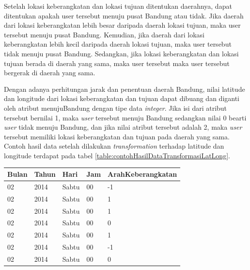 Setelah lokasi keberangkatan dan lokasi tujuan ditentukan daerahnya, dapat ditentukan apakah user tersebut menuju pusat Bandung atau tidak. Jika daerah dari lokasi keberangkatan lebih besar daripada daerah lokasi tujuan, maka user tersebut menuju pusat Bandung. Kemudian, jika daerah dari lokasi keberangkatan lebih kecil daripada daerah lokasi tujuan, maka user tersebut tidak menuju pusat Bandung. Sedangkan, jika lokasi keberangkatan dan lokasi tujuan berada di daerah yang sama, maka user tersebut maka user tersebut bergerak di daerah yang sama.

Dengan adanya perhitungan jarak dan penentuan daerah Bandung, nilai latitude dan longitude dari lokasi keberangkatan dan tujuan dapat dibuang dan diganti oleh atribut menujuBandung dengan tipe data \textsl{integer}. Jika isi dari atribut tersebut bernilai 1, maka \textsl{user} tersebut menuju Bandung sedangkan nilai 0 bearti \textsl{user} tidak menuju Bandung, dan jika nilai atribut tersebut adalah 2, maka \textsl{user} tersebut memiliki lokasi keberangkatan dan tujuan pada daerah yang sama. Contoh hasil data setelah dilakukan \textsl{transformation} terhadap latitude dan longitude terdapat pada tabel \ref{table:contohHasilDataTransformasiLatLong}.

\begin{table}[H]
\caption{Contoh hasil data transformasi latitude longitude}
\label{table:contohHasilDataTransformasiLatLong}
\begin{longtable}{|l|l|l|l|l|}
\hline
\textbf{Bulan}	& \textbf{Tahun} 	& \textbf{Hari} & \textbf{Jam}	& \textbf{ArahKeberangkatan} \\ \hline
02								& 2014						& Sabtu         & 00         	& -1                    \\ \hline
02								& 2014						& Sabtu         & 00         	& 1        					  \\ \hline
02								& 2014						& Sabtu         & 00         	& 1       							\\ \hline
02								& 2014						& Sabtu         & 00         	& 0         						\\ \hline
02								& 2014						& Sabtu         & 00         	& 1          					\\ \hline
02								& 2014						& Sabtu         & 00         	& -1      							\\ \hline
02								& 2014						& Sabtu         & 00         	& 0       							\\ \hline
\end{longtable}
\end{table} 


